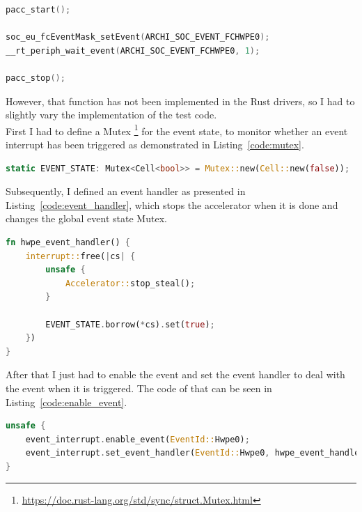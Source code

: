 \begin{minipage}{\textwidth}
\begin{lstlisting}[style=colorEX,language=C,caption={Waiting for the event in C},label={code:c_wait_for_event}]
pacc_start();

soc_eu_fcEventMask_setEvent(ARCHI_SOC_EVENT_FCHWPE0);
__rt_periph_wait_event(ARCHI_SOC_EVENT_FCHWPE0, 1);

pacc_stop();
\end{lstlisting}
\end{minipage}

However, that function has not been implemented in the Rust drivers, so I had to slightly
vary the implementation of the test code.\\
First I had to define a Mutex \footnote{\url{https://doc.rust-lang.org/std/sync/struct.Mutex.html}}
for the event state, to monitor whether an event interrupt has been triggered as demonstrated
in Listing~\ref{code:mutex}.

\begin{lstlisting}[style=colorEX,language=Rust,caption={Definition of the necessary Mutexes},label={code:mutex}]
static EVENT_STATE: Mutex<Cell<bool>> = Mutex::new(Cell::new(false));
\end{lstlisting}

Subsequently, I defined an event handler as presented in Listing~\ref{code:event_handler}, which
stops the accelerator when it is done and changes the global event state Mutex.

\begin{minipage}{\textwidth}
\begin{lstlisting}[style=colorEX,language=Rust,caption={Event handler function},label={code:event_handler}]
fn hwpe_event_handler() {
    interrupt::free(|cs| {
        unsafe {
            Accelerator::stop_steal();
        }

        EVENT_STATE.borrow(*cs).set(true);
    })
}
\end{lstlisting}
\end{minipage}

After that I just had to enable the event and set the event handler to deal with the event when it is triggered.
The code of that can be seen in Listing~\ref{code:enable_event}.

\begin{lstlisting}[style=colorEX,language=Rust,caption={Code to enable the hardware event and set the handler},label={code:enable_event}]
unsafe {
    event_interrupt.enable_event(EventId::Hwpe0);
    event_interrupt.set_event_handler(EventId::Hwpe0, hwpe_event_handler);
}
\end{lstlisting}

